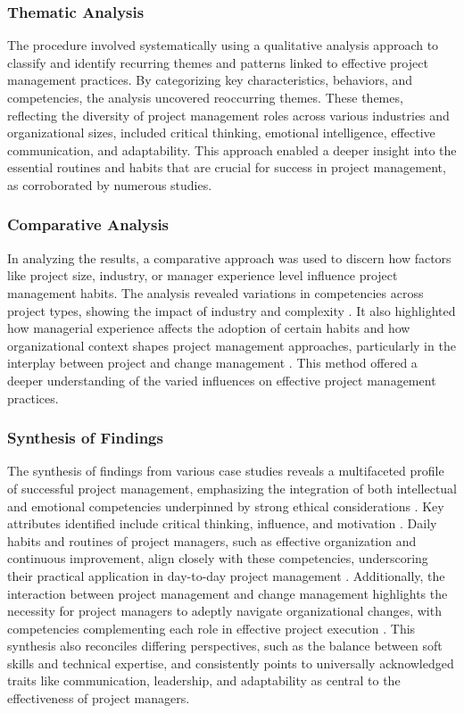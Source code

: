 \documentclass{article}
\begin{document}
\subsubsection{Thematic Analysis}

The procedure involved systematically using a qualitative analysis approach to classify and identify recurring themes and patterns linked to effective project management practices. By categorizing key characteristics, behaviors, and competencies, the analysis uncovered reoccurring themes. These themes, reflecting the diversity of project management roles across various industries and organizational sizes, included critical thinking, emotional intelligence, effective communication, and adaptability. This approach enabled a deeper insight into the essential routines and habits that are crucial for success in project management, as corroborated by numerous studies.


\subsubsection{Comparative Analysis}

In analyzing the results, a comparative approach was used to discern how factors like project size, industry, or manager experience level influence project management habits. The analysis revealed variations in competencies across project types, showing the impact of industry and complexity \cite{muller2010leadership}. It also highlighted how managerial experience affects the adoption of certain habits \cite{sigurdhssonpatterns} and how organizational context shapes project management approaches, particularly in the interplay between project and change management \cite{pollack2016project}. This method offered a deeper understanding of the varied influences on effective project management practices.

\subsubsection{Synthesis of Findings}

The synthesis of findings from various case studies reveals a multifaceted profile of successful project management, emphasizing the integration of both intellectual and emotional competencies underpinned by strong ethical considerations \cite{bredillet2015good}. Key attributes identified include critical thinking, influence, and motivation \cite{muller2010leadership}. Daily habits and routines of project managers, such as effective organization and continuous improvement, align closely with these competencies, underscoring their practical application in day-to-day project management \cite{sigurdhssonpatterns}. Additionally, the interaction between project management and change management highlights the necessity for project managers to adeptly navigate organizational changes, with competencies complementing each role in effective project execution \cite{pollack2016project}. This synthesis also reconciles differing perspectives, such as the balance between soft skills and technical expertise, and consistently points to universally acknowledged traits like communication, leadership, and adaptability as central to the effectiveness of project managers.
\end{document}
